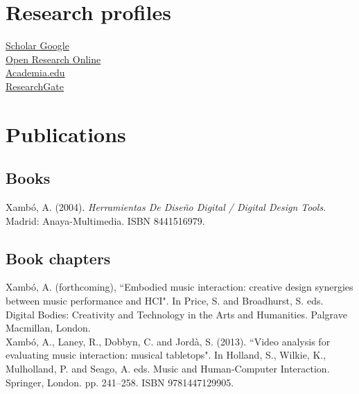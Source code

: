 \documentclass[10pt, a4paper]{article}
\newcommand{\years}[1]{\marginnote{\scriptsize #1}}
\begin{document}
\section*{Research profiles}
\noindent

\textbullet \- \href{https://scholar.google.com/citations?user=yi3WXM8AAAAJ}{Scholar Google}\\
\textbullet \- \href{http://oro.open.ac.uk/view/person/ax22.html}{Open Research Online}\\
\textbullet \- \href{http://open.academia.edu/AnnaXambo}{Academia.edu}\\
\textbullet \- \href{http://www.researchgate.net/profile/Anna_Xambo}{ResearchGate}

\section*{Publications}
\noindent

\subsection*{Books}
\noindent
\years{2004}Xambó, A. (2004). \emph{Herramientas De Diseño Digital / Digital Design Tools}. Madrid: Anaya-Multimedia. ISBN 8441516979.

\subsection*{Book chapters}
\noindent
\years{2016}Xambó, A. (forthcoming), “Embodied music interaction: creative design synergies between music performance and HCI". In Price, S. and Broadhurst, S. eds. Digital Bodies: Creativity and Technology in the Arts and Humanities. Palgrave Macmillan, London.\\
\years{2013}Xambó, A., Laney, R., Dobbyn, C. and Jordà, S. (2013). “Video analysis for evaluating music interaction: musical tabletops". In Holland, S., Wilkie, K., Mulholland, P. and Seago, A. eds. Music and Human-Computer Interaction. Springer, London. pp. 241--258. ISBN 9781447129905.
\end{document}
